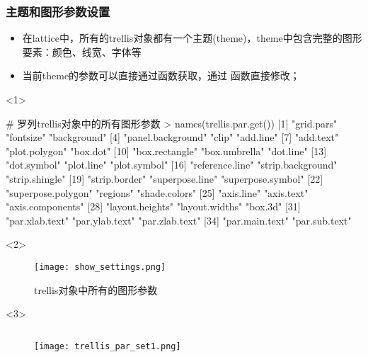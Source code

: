 \subsubsection{主题和图形参数设置}
\begin{frame}[t,fragile]{\subsecname}{\subsubsecname}
\begin{itemize}
\item 在lattice中，所有的trellis对象都有一个主题(theme)，theme中包含完整的图形要素：颜色、线宽、字体等
\item 当前theme的参数可以直接通过函数获取，通过
函数直接修改；
\end{itemize}

\begin{overlayarea}{\textwidth}{\textheight}
\begin{onlyenv}<1>
\begin{rcode}
# 罗列trellis对象中的所有图形参数
> names(trellis.par.get())
 [1] "grid.pars"         "fontsize"          "background"       
 [4] "panel.background"  "clip"              "add.line"         
 [7] "add.text"          "plot.polygon"      "box.dot"          
[10] "box.rectangle"     "box.umbrella"      "dot.line"         
[13] "dot.symbol"        "plot.line"         "plot.symbol"      
[16] "reference.line"    "strip.background"  "strip.shingle"    
[19] "strip.border"      "superpose.line"    "superpose.symbol" 
[22] "superpose.polygon" "regions"           "shade.colors"     
[25] "axis.line"         "axis.text"         "axis.components"  
[28] "layout.heights"    "layout.widths"     "box.3d"           
[31] "par.xlab.text"     "par.ylab.text"     "par.zlab.text"    
[34] "par.main.text"     "par.sub.text"    
\end{rcode}
\end{onlyenv}

\vspace{-10pt}
\begin{onlyenv}<2>
\begin{figure}[ht]
  \centering
  \texttt{[image: show\_settings.png]}
  \caption{trellis对象中所有的图形参数}
\end{figure}
\end{onlyenv}

\begin{onlyenv}<3>
\begin{figure}
 \begin{columns}
    \begin{column}[c]{.4\textwidth}
        \texttt{[image: trellis\_par\_set1.png]}
    \end{column}


\end{columns}
\end{figure}
\end{onlyenv}
\end{overlayarea}
\end{frame}
